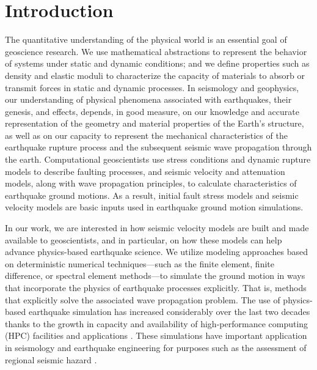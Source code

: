 
\section{Introduction}
\label{sec:introduction}

The quantitative understanding of the physical world is an essential goal of geoscience research. We use mathematical abstractions to represent the behavior of systems under static and dynamic conditions; and we define properties such as density and elastic moduli to characterize the capacity of materials to absorb or transmit forces in static and dynamic processes. In seismology and geophysics, our understanding of physical phenomena associated with earthquakes, their genesis, and effects, depends, in good measure, on our knowledge and accurate representation of the geometry and material properties of the Earth's structure, as well as on our capacity to represent the mechanical characteristics of the earthquake rupture process and the subsequent seismic wave propagation through the earth. Computational geoscientists use stress conditions and dynamic rupture models to describe faulting processes, and seismic velocity and attenuation models, along with wave propagation principles, to calculate characteristics of earthquake ground motions. As a result, initial fault stress models and seismic velocity models are basic inputs used in earthquake ground motion simulations.

In our work, we are interested in how seismic velocity models are built and made available to geoscientists, and in particular, on how these models can help advance physics-based earthquake science. We utilize modeling approaches based on deterministic numerical techniques---such as the finite element, finite difference, or spectral element methods---to simulate the ground motion in ways that incorporate the physics of earthquake processes explicitly. That is, methods that explicitly solve the associated wave propagation problem. The use of physics-based earthquake simulation has increased considerably over the last two decades thanks to the growth in capacity and availability of high-performance computing (HPC) facilities and applications \citep[e.g.,][]{Aagaard_2008_BSSA2, Olsen_2009_GRL, Bielak_2010_GJI, Cui_2010_Proc}. These simulations have important application in seismology and earthquake engineering for purposes such as the assessment of regional seismic hazard \citep[e.g.,][]{Graves_2011_PAG}.

